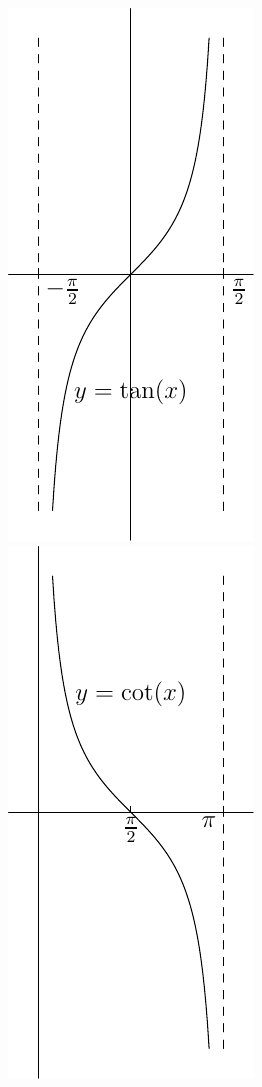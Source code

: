 \documentclass[UTF8, fontset=ubuntu]{ctexart}
\begin{document}
\begin{figure}
\centering
\includegraphics{tan.pdf}\qquad\includegraphics{cot.pdf}
\end{figure}
\end{document}
